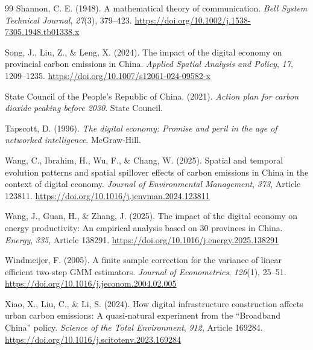 \documentclass[economies,article,submit,moreauthors]{Definitions/mdpi}
\begin{document}
\begin{thebibliography}{99}
Shannon, C. E. (1948). A mathematical theory of communication. \textit{Bell System Technical Journal}, \textit{27}(3), 379--423. \url{https://doi.org/10.1002/j.1538-7305.1948.tb01338.x}

Song, J., Liu, Z., \& Leng, X. (2024). The impact of the digital economy on provincial carbon emissions in China. \textit{Applied Spatial Analysis and Policy}, \textit{17}, 1209--1235. \url{https://doi.org/10.1007/s12061-024-09582-x}

State Council of the People's Republic of China. (2021). \textit{Action plan for carbon dioxide peaking before 2030}. State Council.

Tapscott, D. (1996). \textit{The digital economy: Promise and peril in the age of networked intelligence}. McGraw-Hill.

Wang, C., Ibrahim, H., Wu, F., \& Chang, W. (2025). Spatial and temporal evolution patterns and spatial spillover effects of carbon emissions in China in the context of digital economy. \textit{Journal of Environmental Management}, \textit{373}, Article 123811. \url{https://doi.org/10.1016/j.jenvman.2024.123811}

Wang, J., Guan, H., \& Zhang, J. (2025). The impact of the digital economy on energy productivity: An empirical analysis based on 30 provinces in China. \textit{Energy}, \textit{335}, Article 138291. \url{https://doi.org/10.1016/j.energy.2025.138291}

Windmeijer, F. (2005). A finite sample correction for the variance of linear efficient two-step GMM estimators. \textit{Journal of Econometrics}, \textit{126}(1), 25--51. \url{https://doi.org/10.1016/j.jeconom.2004.02.005}

Xiao, X., Liu, C., \& Li, S. (2024). How digital infrastructure construction affects urban carbon emissions: A quasi-natural experiment from the ``Broadband China'' policy. \textit{Science of the Total Environment}, \textit{912}, Article 169284. \url{https://doi.org/10.1016/j.scitotenv.2023.169284}


\end{thebibliography}
\end{document}

